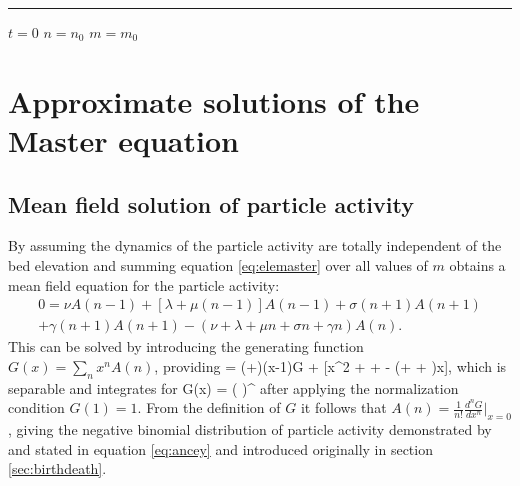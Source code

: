 \rule{\linewidth}{1pt}

\begin{algorithmic}
	\State $t = 0$ 
	\State $n = n_0$
	\State $m =  m_0$
	
	\EndWhile
\end{algorithmic}

\section{Approximate solutions of the Master equation}

\subsection{Mean field solution of particle activity}

By assuming the dynamics of the particle activity are totally independent of the bed elevation and summing equation \ref{eq:elemaster} over all values of $m$ obtains a mean field equation for the particle activity: 
\begin{multline} 0 = \nu A(n-1) + [\lambda + \mu(n-1)]A(n-1) + \sigma(n+1)A(n+1) \\
	+\gamma(n+1)A(n+1)-(\nu  + \lambda + \mu n + \sigma n + \gamma n)A(n).\end{multline}
This can be solved by introducing the generating function \citep{Cox1965} $G(x) = \sum_n x^n A(n)$, providing
 = (\nu+\lambda)(x-1)G + [\mu x^2 + \sigma + \gamma - (\mu + \sigma + \gamma)x],\ee
which is separable and integrates for 
\be G(x) = \Bigg( \Bigg)^{\frac{\nu + \lambda}{\mu}}\ee
after applying the normalization condition $G(1)=1$.
From the definition of $G$ it follows that $A(n) = \frac{1}{n!} \frac{d^nG}{dx^n}|_{x=0}$, giving the negative binomial distribution of particle activity demonstrated by \citet{Ancey2008} and stated in equation \ref{eq:ancey} and introduced originally in section \ref{sec:birthdeath}.

